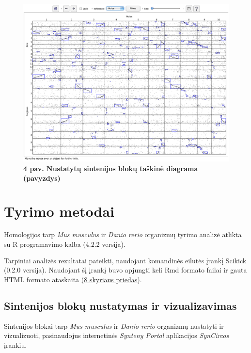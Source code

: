 \documentclass[12pt]{article}
\begin{document}
\begin{figure}[htb]
    \begin{center}
        \includegraphics[width=0.8\linewidth]{../Figures/Synteny_dotplot_example.png}
        \vspace{-0.5\baselineskip}
        \caption*{\small\textbf{4 pav. Nustatytų sintenijos blokų taškinė
                                diagrama (pavyzdys)}}
        \label{fig:4}
    \end{center}
\end{figure}

\newpage


\section{Tyrimo metodai}
Homologijos tarp \emph{Mus musculus} ir \emph{Danio rerio} organizmų tyrimo
analizė atlikta su R programavimo kalba\cite{R} (4.2.2 versija).

Tarpiniai analizės rezultatai pateikti, naudojant komandinės eilutės įrankį
Scikick\cite{SCIK} (0.2.0 versija). Naudojant šį įrankį buvo apjungti keli Rmd
formato failai ir gauta HTML formato ataskaita \hyperref[Priedas]{(8 skyriaus
priedas)}.

\subsection{Sintenijos blokų nustatymas ir vizualizavimas}
Sintenijos blokai tarp \emph{Mus musculus} ir \emph{Danio rerio} organizmų
nustatyti ir vizualizuoti, pasinaudojus internetinės
\emph{Synteny Portal}\cite{SYN_PORT} aplikacijos \emph{SynCircos} įrankiu.
\end{document}
